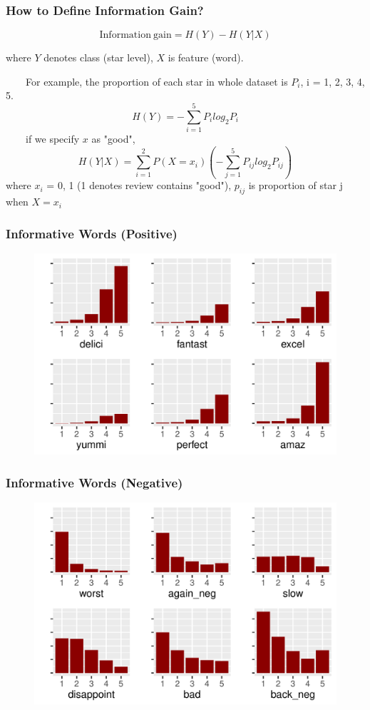 \documentclass[notheorems, aspectratio=54]{beamer}
\begin{document}
\begin{frame}
\frametitle{How to Define Information Gain?}
$$\mathrm{Information\ gain} = H(Y) - H(Y|X)$$

where $Y$ denotes class (star level), $X$ is feature (word).

\ \ \ \ For example, the proportion of each star in whole dataset is $P_i$, i = 1, 2, 3, 4, 5. 
$$H(Y)=-\sum_{i=1}^{5}P_i log_2 P_i$$
\ \ \ \ if we specify $x$ as "good",
$$H(Y|X)=\sum_{i=1}^{2}P(X=x_i)(-\sum_{j=1}^{5}P_{ij} log_2 P_{ij})$$
where $x_i$ = 0, 1 (1 denotes review contains "good"), $p_{ij}$ is proportion of star j when $X=x_i$
\end{frame}

\begin{frame}
\frametitle{Informative Words (Positive)}
\begin{figure}[H]
	\centering
	\includegraphics[width=4.6in]{positive.pdf}
\end{figure}
\end{frame}

\begin{frame}
\frametitle{Informative Words (Negative)}
\begin{figure}[H]
	\centering
	\includegraphics[width=4.6in]{negative.pdf}
\end{figure}
\end{frame}
\end{document}
